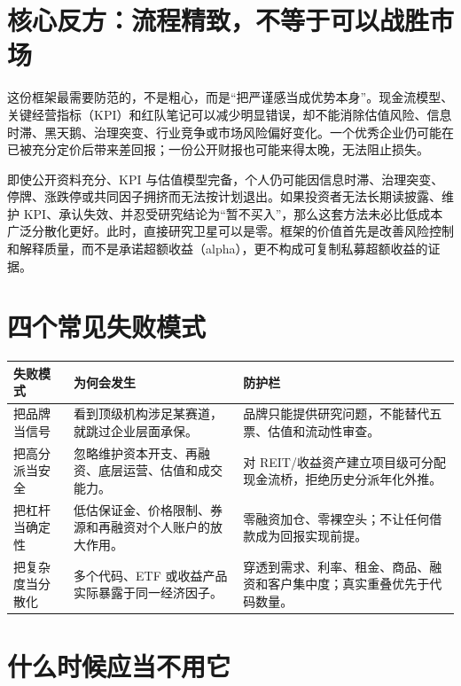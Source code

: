 \section{核心反方：流程精致，不等于可以战胜市场}

这份框架最需要防范的，不是粗心，而是“把严谨感当成优势本身”。现金流模型、关键经营指标（KPI）和红队笔记可以减少明显错误，却不能消除估值风险、信息时滞、黑天鹅、治理突变、行业竞争或市场风险偏好变化。一个优秀企业仍可能在已被充分定价后带来差回报；一份公开财报也可能来得太晚，无法阻止损失。

\begin{riskbox}[红队结论]
即使公开资料充分、KPI 与估值模型完备，个人仍可能因信息时滞、治理突变、停牌、涨跌停或共同因子拥挤而无法按计划退出。如果投资者无法长期读披露、维护 KPI、承认失效、并忍受研究结论为“暂不买入”，那么这套方法未必比低成本广泛分散化更好。此时，直接研究卫星可以是零。框架的价值首先是改善风险控制和解释质量，而不是承诺超额收益（alpha），更不构成可复制私募超额收益的证据。
\end{riskbox}

\section{四个常见失败模式}

\begin{exhibitbox}
\small
\begin{tabularx}{\exhibitboxwidth}{L{3.2cm}X X}
\toprule
\textbf{失败模式} & \textbf{为何会发生} & \textbf{防护栏} \\
\midrule
把品牌当信号 & 看到顶级机构涉足某赛道，就跳过企业层面承保。 & 品牌只能提供研究问题，不能替代五票、估值和流动性审查。 \\
把高分派当安全 & 忽略维护资本开支、再融资、底层运营、估值和成交能力。 & 对 REIT/收益资产建立项目级可分配现金流桥，拒绝历史分派年化外推。 \\
把杠杆当确定性 & 低估保证金、价格限制、券源和再融资对个人账户的放大作用。 & 零融资加仓、零裸空头；不让任何借款成为回报实现前提。 \\
把复杂度当分散化 & 多个代码、ETF 或收益产品实际暴露于同一经济因子。 & 穿透到需求、利率、租金、商品、融资和客户集中度；真实重叠优先于代码数量。 \\
\bottomrule
\end{tabularx}
\end{exhibitbox}

\section{什么时候应当不用它}

